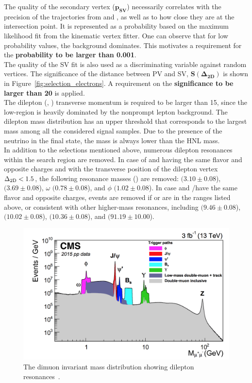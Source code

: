 The quality of the secondary vertex ($\boldsymbol{ p_{SV}}$)
necessarily correlates with the precision of the trajectories from
\ltwo and \lthree, as well as to how close they are at the intersection point. It is represented as a probability based on the maximum likelihood fit from the kinematic vertex fitter. One can observe that for low probability values, the background dominates. This motivates a requirement for the \textbf{probability to be larger than 0.001}. \\

The quality of the SV fit is also used as a discriminating variable against random vertices. The significance of the distance between PV and SV, $\boldsymbol{ S(\Delta_{2D})}$ is shown in Figure~\ref{fig:selection_electrons}. A requirement on the \textbf{significance to be larger than 20} is applied.\\

The dilepton (\ltwo, \lthree) transverse momentum  is required to be
larger than 15\GeV, since the low-\pt region is heavily dominated by
the nonprompt lepton background.
The dilepton mass \mtwol distribution has an upper threshold that
corresponds to the largest mass among all the considered signal
samples. Due to the presence of the neutrino in the final state, the
mass is always lower than the HNL mass.\\

In addition to the selections mentioned above, numerous dilepton
resonances within the search
 region are removed.
In case of \ltwo and \lthree having the same flavor and opposite
charges and with the transverse position of the dilepton vertex
$\Delta_{\mathrm{2D}}<1.5$\cm, the following resonance masses (\mtwol) are
removed: 
\JPsi $(3.10 \pm 0.08$\GeV), \Pgy $(3.69 \pm 0.08$\GeV), $\omega$
$(0.78 \pm 0.08$\GeV), and $\phi$ $(1.02 \pm 0.08$\GeV).
In case \lone and \ltwo/\lthree have the same flavor and opposite
charges, events are removed if \mlonetwo or \mlonethree are in the
ranges listed above, or consistent with other higher-mass resonances,
including \PgUa $(9.46 \pm 0.08$\GeV), \PgUb $(10.02 \pm 0.08$\GeV),
\PgUc $(10.36 \pm 0.08$\GeV), and \PZ $(91.19 \pm 10.00$\GeV).
 \begin{figure}[h]
\centering
\includegraphics[clip,trim=1.2cm 0.1cm 0.8cm 0.3cm, width=.70\textwidth]{Figures/c2/dimuon}
\caption{The dimuon invariant mass distribution showing dilepton resonances~\cite{Sirunyan_2018_muon}.}
\label{fig:c6dimuon}
\end{figure}

